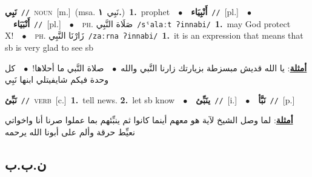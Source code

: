 \documentclass[10pt,a4paper,twoside]{article} %
\begin{document}
\begin{multicols}{2}
{\setlength\topsep{0pt}\textbf{\foreignlanguage{arabic}{نَبِي}}\ {\color{gray}\texttt{//}\color{black}}\ \textsc{noun}\ [m.]\ \color{gray}(msa. \foreignlanguage{arabic}{نَبِي}~\foreignlanguage{arabic}{\textbf{١.}})\color{black}\ \textbf{1.}~prophet\ \ $\bullet$\ \ \setlength\topsep{0pt}\textbf{\foreignlanguage{arabic}{أَنْبِيَاء}}\ {\color{gray}\texttt{//}\color{black}}\ [pl.]\ \ $\bullet$\ \ \setlength\topsep{0pt}\textbf{\foreignlanguage{arabic}{أَنْبَيَاء}}\ {\color{gray}\texttt{//}\color{black}}\ [pl.]\ \ $\bullet$\ \ \textsc{ph.} \color{gray} \foreignlanguage{arabic}{صَلَاة النَّبِي}\color{black}\ {\color{gray}\texttt{/{\sffamily sˤalaːt ʔinnabi}/}\color{black}}\ \textbf{1.}~may God protect X!\ \ $\bullet$\ \ \textsc{ph.} \color{gray} \foreignlanguage{arabic}{زَارْنَا النَّبِي}\color{black}\ {\color{gray}\texttt{/{\sffamily zaːrna ʔinnabi}/}\color{black}}\ \textbf{1.}~it is an expression that means that sb is very glad to see sb\  \begin{flushright}\color{gray}\foreignlanguage{arabic}{\textbf{\underline{\foreignlanguage{arabic}{أمثلة}}}: يا الله قديش مبسزطة بزيارتك زارنا النَّبي والله\ $\bullet$\ \  صلاة النَّبي ما أحلاها!\ $\bullet$\ \  كل وحدة فيكم شايفيتلي ابنها نَبِي}\end{flushright}\color{black}} \vspace{2mm}

{\setlength\topsep{0pt}\textbf{\foreignlanguage{arabic}{نَبِّئ}}\ {\color{gray}\texttt{//}\color{black}}\ \textsc{verb}\ [c.]\ \textbf{1.}~tell news.  \textbf{2.}~let sb know\ \ $\bullet$\ \ \setlength\topsep{0pt}\textbf{\foreignlanguage{arabic}{ينَبِّئ}}\ {\color{gray}\texttt{//}\color{black}}\ [i.]\ \ $\bullet$\ \ \setlength\topsep{0pt}\textbf{\foreignlanguage{arabic}{نَبَّأ}}\ {\color{gray}\texttt{//}\color{black}}\ [p.]\  \begin{flushright}\color{gray}\foreignlanguage{arabic}{\textbf{\underline{\foreignlanguage{arabic}{أمثلة}}}: لما وصل الشيخ لآية هو معهم أينما كانوا ثم ينبِّئهم بما عملوا صرنا أنا واخواتي نعيِّط حرقة وألم على أبونا الله يرحمه}\end{flushright}\color{black}} \vspace{2mm}

\vspace{-3mm}
\subsection*{\color{blue}\foreignlanguage{arabic}{ن.ب.ب}\color{blue}{}} 


\end{multicols}
\end{document}
